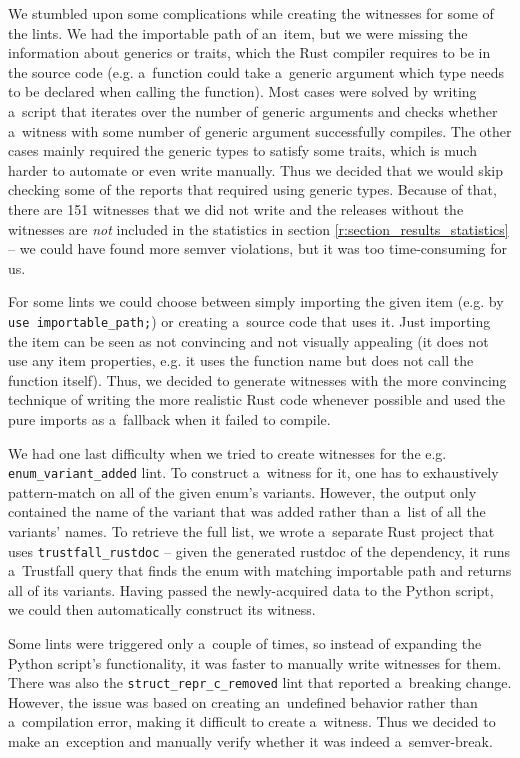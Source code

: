 \documentclass[licencjacka,en]{pracamgr}
\begin{document}
We stumbled upon some complications while creating the witnesses for some of the lints.
We had the importable path of an~item, but we were missing the information
about generics or traits, which the Rust compiler requires to be in the source code
(e.g. a~function could take a~generic argument which type needs to be declared when calling the function).
Most cases were solved by writing a~script that iterates over the number of generic arguments
and checks whether a~witness with some number of generic argument successfully compiles.
The other cases mainly required the generic types to satisfy some traits,
which is much harder to automate or even write manually.
Thus we decided that we would skip checking some of the reports that required using generic types.
Because of that, there are 151 witnesses that we did not write
and the releases without the witnesses are \textit{not} included in the statistics in section \ref{r:section_results_statistics}
-- we could have found more semver violations, but it was too time-consuming for us.

For some lints we could choose between simply importing the given item
(e.g. by \texttt{use importable\_path;}) or creating a~source code that uses it.
Just importing the item can be seen as not convincing and not visually appealing (it does not use any item properties,
e.g. it uses the function name but does not call the function itself).
Thus, we decided to generate witnesses with the more convincing technique of writing the more realistic Rust code whenever possible
and used the pure imports as a~fallback when it failed to compile.

We had one last difficulty when we tried to create witnesses for the e.g. \texttt{enum\_variant\_added} lint.
To construct a~witness for it, one has to exhaustively pattern-match
on all of the given enum's variants. However, the output only contained the name
of the variant that was added rather than a~list of all the variants' names.
To retrieve the full list, we wrote a~separate
Rust project that uses \texttt{trustfall\_rustdoc} -- given the generated rustdoc of the dependency,
it runs a~Trustfall query that finds the enum with matching importable path and returns
all of its variants. Having passed the newly-acquired data to the Python script,
we could then automatically construct its witness.

Some lints were triggered only a~couple of times, so instead of expanding the Python script's functionality, it was faster to manually write witnesses for them.
There was also the \texttt{struct\_repr\_c\_removed} lint that reported a~breaking change.
However, the issue was based on creating an~undefined behavior rather than a~compilation error,
making it difficult to create a~witness.
Thus we decided to make an~exception and manually verify whether it was indeed a~semver-break.
\end{document}

